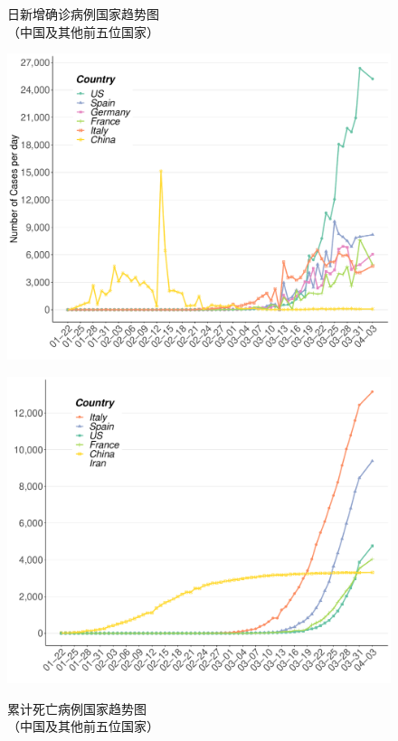 \documentclass[
]{article}
\begin{document}
\begin{figure}[H]
\centering
\begin{minipage}[b]{0.45\linewidth}
\caption{日新增确诊病例国家趋势图\\（中国及其他前五位国家）}
\includegraphics[]{./input/covid2.pdf}
\label{}
\end{minipage}
\quad
\begin{minipage}[b]{0.45\linewidth}
\caption{累计死亡病例国家趋势图\\（中国及其他前五位国家） }
\includegraphics[]{./input/covid3.pdf}
\label{}
\end{minipage}
\end{figure}
\end{document}
